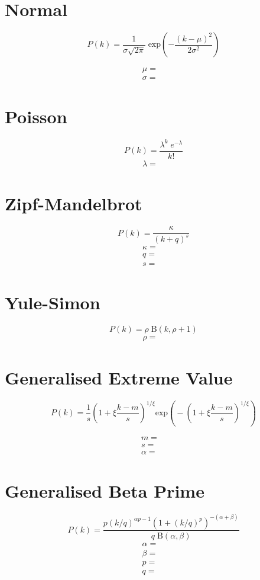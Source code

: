 \documentclass{article}
\begin{document}
\section{Normal}

\[
P(k) = \frac{1} {\sigma \sqrt{2\pi}} \; \textrm{exp} \left({-\frac{(k - \mu)^2}{2\sigma^2}}\right)
\]

\begin{align*}
\mu = & \\
\sigma = & 
\end{align*}

\section{Poisson}

\[
P(k) = \frac{\lambda^k \; e^{-\lambda}}{k!}
\]
\begin{align*}
\lambda = &
\end{align*}


\section{Zipf-Mandelbrot}

\[
P(k) = \frac{\kappa}{(k + q)^{s}}
\]
\begin{align*}
\kappa = & \\
q = & \\
s = &
\end{align*}


\section{Yule-Simon}

\[
P(k) = \rho \; \textrm{B}(k, \rho + 1)
\]
\begin{align*}
\rho = & 
\end{align*}

\section{Generalised Extreme Value}

\[
P(k) = \frac{1}{s}\left (\! 1 + \xi\frac{k - m}{s}\right)^{\! \! 1 / \xi} \!\! \textrm{exp} \left(\! -\left(\! 1 + \xi\frac{k - m}{s}\right)^{\! \! 1 / \xi}\right)
\]

\begin{align*}
m = & \\ 
s = & \\
\alpha = &
\end{align*}


\section{Generalised Beta Prime}

\[
P(k) = \frac{p (k / q)^{\alpha p - 1} (1 + (k / q)^p)^{-(\alpha + \beta)}}{q \; \textrm{B}({\alpha, \beta})}
\]
\begin{align*}
\alpha = & \\ 
\beta = & \\
p = & \\
q = &
\end{align*}
\end{document}
